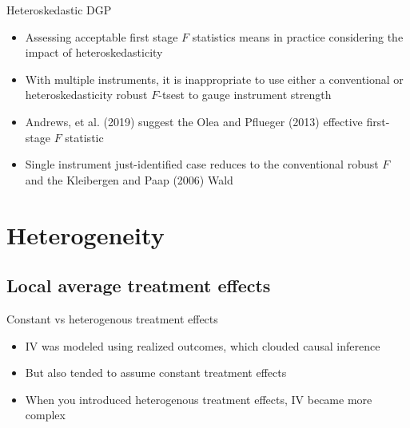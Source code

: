 \documentclass{beamer}
\begin{document}
\begin{frame}{Heteroskedastic DGP}

\begin{itemize}
\item Assessing acceptable first stage $F$ statistics means in practice considering the impact of heteroskedasticity
\item With multiple instruments, it is inappropriate to use either a conventional or heteroskedasticity robust $F$-tsest to gauge instrument strength
\item Andrews, et al. (2019) suggest the Olea and Pflueger (2013) effective first-stage $F$ statistic
\item Single instrument just-identified case reduces to the conventional robust $F$ and the Kleibergen and Paap (2006) Wald
\end{itemize}

\end{frame}




\section{Heterogeneity}



\subsection{Local average treatment effects}

\begin{frame}{Constant vs heterogenous treatment effects}

\begin{itemize}
\item IV was modeled using realized outcomes, which clouded causal inference
\item But also tended to assume constant treatment effects
\item When you introduced heterogenous treatment effects, IV became more complex 
\end{itemize}

\end{frame}
\end{document}
